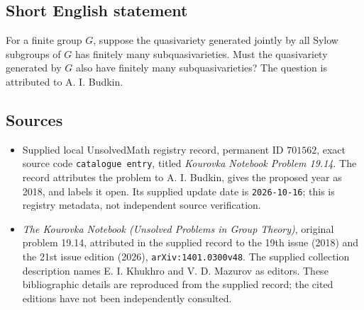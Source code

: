 \documentclass[11pt]{article}
\begin{document}
\subsection{Short English statement}
For a finite group \(G\), suppose the quasivariety generated jointly by all Sylow subgroups of \(G\) has finitely many subquasivarieties. Must the quasivariety generated by \(G\) also have finitely many subquasivarieties? The question is attributed to A. I. Budkin.
\subsection{Sources}
\begin{itemize}
\item Supplied local UnsolvedMath registry record, permanent ID \(701562\), exact source code \texttt{catalogue entry}, titled \emph{Kourovka Notebook Problem 19.14}. The record attributes the problem to A. I. Budkin, gives the proposed year as 2018, and labels it open. Its supplied update date is \texttt{2026-10-16}; this is registry metadata, not independent source verification.
\item \emph{The Kourovka Notebook (Unsolved Problems in Group Theory)}, original problem 19.14, attributed in the supplied record to the 19th issue (2018) and the 21st issue edition (2026), \texttt{arXiv:1401.0300v48}. The supplied collection description names E. I. Khukhro and V. D. Mazurov as editors. These bibliographic details are reproduced from the supplied record; the cited editions have not been independently consulted.
\end{itemize}
\end{document}
